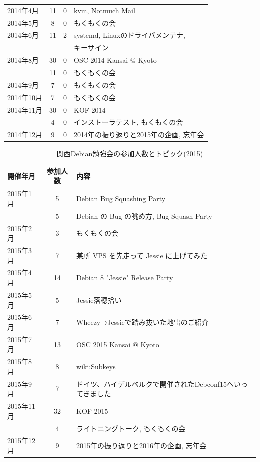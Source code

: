 \documentclass[mingoth,a4paper]{jsarticle}
\begin{document}
\begin{table}
\begin{minipage}{.5\linewidth}
\begin{center}
\begin{tabular}{|l|c|c|p{10em}|}
        2014年4月 &11    &0     & kvm, Notmuch Mail \\
        2014年5月 & 8    &0     & もくもくの会 \\
        2014年6月 &11    &2     & systemd, Linuxのドライバメンテナ, \\
                  &      &      & キーサイン \\
        2014年8月 &30    &0     & OSC 2014 Kansai @ Kyoto \\
                  &11    &0     & もくもくの会 \\
        2014年9月 & 7    &0     & もくもくの会 \\
        2014年10月& 7    &0     & もくもくの会 \\
        2014年11月&30    &0     & KOF 2014 \\
                  & 4    &0     & インストーラテスト, もくもくの会 \\
        2014年12月& 9    &0     & 2014年の振り返りと2015年の企画, 忘年会 \\
        \hline
      \end{tabular}
    \end{center}
  \end{minipage}
\end{table}

\begin{table}
    \caption{関西Debian勉強会の参加人数とトピック(2015)}
    \label{tab:count2015kansai}
    \begin{center}
      \begin{tabular}{|l|c|l|}
        \hline
        開催年月  & 参加人数 & 内容 \\
        \hline
        2015年1月 &5      & Debian Bug Squashing Party \\
                  &5      & Debian の Bug の眺め方, Bug Squash Party \\
        2015年2月 &3      & もくもくの会 \\
        2015年3月 &7      & 某所 VPS を先走って Jessie に上げてみた \\
        2015年4月 &14     & Debian 8 "Jessie" Release Party \\
        2015年5月 &5      & Jessie落穂拾い \\
        2015年6月 &7      & Wheezy→Jessieで踏み抜いた地雷のご紹介 \\
        2015年7月 &13     & OSC 2015 Kansai @ Kyoto \\
        2015年8月 &8      & wiki:Subkeys \\
        2015年9月 &7      & ドイツ、ハイデルベルクで開催されたDebconf15へいってきました \\
        2015年11月&32     & KOF 2015 \\
                  &4      & ライトニングトーク, もくもくの会 \\
        2015年12月&9      & 2015年の振り返りと2016年の企画, 忘年会 \\
        \hline
      \end{tabular}
    \end{center}
\end{table}
\end{document}

